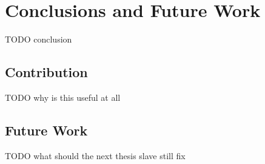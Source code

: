 
 \chapter{Conclusions and Future Work}

  TODO conclusion

  \section{Contribution}

   TODO why is this useful at all

  \section{Future Work}

   TODO what should the next thesis slave still fix

